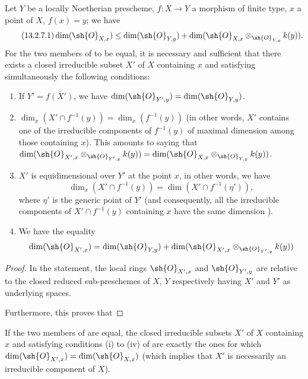 \begin{proposition}[13.2.7]
\label{IV.13.2.7}
Let $Y$ be a locally Noetherian prescheme, $f:X\to Y$ a morphism of finite type, $x$ a point of $X$, $f(x)=y$; we have
\[
\tag{13.2.7.1}
  \dim(\sh{O}_{X,x})\leq\dim(\sh{O}_{Y,y})+\dim(\sh{O}_{X,x}\otimes_{\sh{O}_{Y,y}}k(y)).
\]
For the two members of  to be equal, it is necessary and sufficient that there exists a closed irreducible subset $X'$ of $X$ containing $x$ and satisfying simultaneously the following conditions:
\begin{enumerate}[label=(\roman*)]
  \item If $Y'=\overline{f(X')}$, we have $\dim(\sh{O}_{Y',y})=\dim(\sh{O}_{Y,y})$.
  \item $\dim_x(X'\cap f^{-1}(y))=\dim_x(f^{-1}(y))$ (in other words, $X'$ contains one of the irreducible components of $f^{-1}(y)$ of maximal dimension among those containing $x$). This amounts to saying that $\dim(\sh{O}_{X',x}\otimes_{\sh{O}_{Y',y}}k(y))=\dim(\sh{O}_{X,x}\otimes_{\sh{O}_{Y,y}}k(y))$.
  \item $X'$ is equidimensional over $Y'$ at the point $x$, in other words, we have
  \[
    \dim_x(X'\cap f^{-1}(y))=\dim(X'\cap f^{-1}(\eta')),
  \]
  where $\eta'$ is the generic point of $Y'$ (and consequently, all the irreducible components of $X'\cap f^{-1}(y)$ containing $x$ have the same dimension ).
  \item We have the equality
  \[
    \dim(\sh{O}_{X',x})=\dim(\sh{O}_{Y,y})+\dim(\sh{O}_{X',x}\otimes_{\sh{O}_{Y',y}}k(y))
  \]
\end{enumerate}
\end{proposition}


\begin{proof}
In the statement, the local rings $\sh{O}_{X',x}$ and $\sh{O}_{Y',y}$ are relative to the closed reduced sub-preschemes of $X$, $Y$ respectively having $X'$ and $Y'$ as underlying spaces.

Furthermore, this proves that
\end{proof}

\begin{corollary}[13.2.8]
\label{IV.13.2.8}
If the two members of  are equal, the closed irreducible subsets $X'$ of $X$ containing $x$ and satisfying conditions (i) to (iv) of  are exactly the ones for which $\dim(\sh{O}_{X',x})=\dim(\sh{O}_{X,x})$ (which implies that $X'$ is necessarily an irreducible component of $X$).
\end{corollary}

